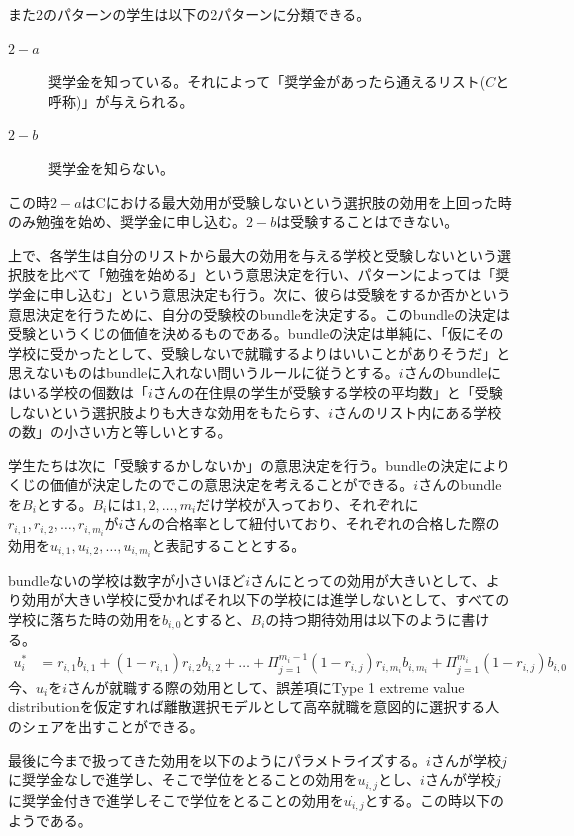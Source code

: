 \documentclass{jsarticle}
\begin{document}
	\par
	また2のパターンの学生は以下の2パターンに分類できる。
	\begin{description}
		\item[$2-a$] 奨学金を知っている。それによって「奨学金があったら通えるリスト($C$と呼称)」が与えられる。
		\item[$2-b$] 奨学金を知らない。
	\end{description}
	この時$2-a$はCにおける最大効用が受験しないという選択肢の効用を上回った時のみ勉強を始め、奨学金に申し込む。$2-b$は受験することはできない。
	\par
	上で、各学生は自分のリストから最大の効用を与える学校と受験しないという選択肢を比べて「勉強を始める」という意思決定を行い、パターンによっては「奨学金に申し込む」という意思決定も行う。次に、彼らは受験をするか否かという意思決定を行うために、自分の受験校のbundleを決定する。このbundleの決定は受験というくじの価値を決めるものである。bundleの決定は単純に、「仮にその学校に受かったとして、受験しないで就職するよりはいいことがありそうだ」と思えないものはbundleに入れない問いうルールに従うとする。$i$さんのbundleにはいる学校の個数は「$i$さんの在住県の学生が受験する学校の平均数」と「受験しないという選択肢よりも大きな効用をもたらす、$i$さんのリスト内にある学校の数」の小さい方と等しいとする。
	\par
	学生たちは次に「受験するかしないか」の意思決定を行う。bundleの決定によりくじの価値が決定したのでこの意思決定を考えることができる。$i$さんのbundleを$B_i$とする。$B_i$には$1,2, \dots, m_i$だけ学校が入っており、それぞれに$r_{i,1}, r_{i,2}, \dots, r_{i,m_i}$が$i$さんの合格率として紐付いており、それぞれの合格した際の効用を$u_{i, 1}, u_{i, 2}, \dots, u_{i, m_{i}}$と表記することとする。
	\par
	bundleないの学校は数字が小さいほど$i$さんにとっての効用が大きいとして、より効用が大きい学校に受かればそれ以下の学校には進学しないとして、すべての学校に落ちた時の効用を$b_{i, 0}$とすると、$B_i$の持つ期待効用は以下のように書ける。
	\begin{align*}
		u_i^* &= r_{i, 1}b_{i, 1} + (1-r_{i, 1})r_{i, 2} b_{i, 2} + \dots + \Pi_{j = 1}^{m_i - 1} (1 - r_{i, j}) r_{i, m_{i}} b_{i, m_{i}} + \Pi_{j = 1}^{m_{i}} (1 - r_{i, j}) b_{i, 0} 
	\end{align*}
	今、$u_i$を$i$さんが就職する際の効用として、誤差項にType 1 extreme value distributionを仮定すれば離散選択モデルとして高卒就職を意図的に選択する人のシェアを出すことができる。
	\par
	最後に今まで扱ってきた効用を以下のようにパラメトライズする。$i$さんが学校$j$に奨学金なしで進学し、そこで学位をとることの効用を$u_{i, j}$とし、$i$さんが学校$j$に奨学金付きで進学しそこで学位をとることの効用を$\dot{u_{i, j}}$とする。この時以下のようである。
\end{document}

